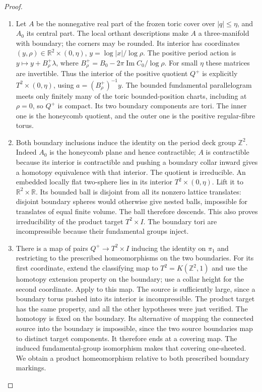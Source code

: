 \begin{proof}
\begin{enumerate}[label=\arabic*.,leftmargin=*]
\item Let $A$ be the nonnegative real part of the frozen toric
cover over $|q|\leq\eta$, and $A_0$ its central part.
The local orthant descriptions make $A$ a three-manifold
with boundary; the corners may be rounded.  Its interior
has coordinates $(y,\rho)\in\mathbb R^2\times(0,\eta)$,
$y=\log|x|/\log\rho$.  The positive period action is
$y\mapsto y+B_\rho^+\lambda$, where
$B_\rho^+=B_0-2\pi\operatorname{Im}C_0/\log\rho$.
For small $\eta$ these matrices are invertible.  Thus the
interior of the positive quotient $Q^+$ is explicitly
$T^2\times(0,\eta)$, using $a=(B_\rho^+)^{-1}y$.
The bounded fundamental parallelogram meets only finitely
many of the toric bounded-position charts, including at
$\rho=0$, so $Q^+$ is compact.  Its two boundary components
are tori.  The inner one is the honeycomb quotient, and
the outer one is the positive regular-fibre torus.

\item Both boundary inclusions induce the identity on the period
deck group $\mathbb Z^2$.  Indeed $A_0$ is the honeycomb
plane and hence contractible; $A$ is contractible because
its interior is contractible and pushing a boundary collar
inward gives a homotopy equivalence with that interior.
The quotient is irreducible.  An embedded locally flat
two-sphere lies in its interior $T^2\times(0,\eta)$.
Lift it to $\mathbb R^2\times\mathbb R$.  Its bounded
ball is disjoint from all its nonzero lattice translates:
disjoint boundary spheres would otherwise give nested
balls, impossible for translates of equal finite volume.
The ball therefore descends.  This also proves
irreducibility of the product target $T^2\times I$.
The boundary tori are incompressible because their
fundamental groups inject.

\item There is a map of pairs $Q^+\to T^2\times I$ inducing
the identity on $\pi_1$ and restricting to the prescribed
homeomorphisms on the two boundaries.  For its first
coordinate, extend the classifying map to $T^2=K(\mathbb
Z^2,1)$ and use the homotopy extension property on the
boundary; use a collar height for the second coordinate.
Apply \cite[Theorem 6.1, p.~77]{mapsWaldhausen68} to this
map.  The source is sufficiently large, since a boundary
torus pushed into its interior is incompressible.  The
product target has the same property, and all the other
hypotheses were just verified.  The homotopy is fixed on
the boundary.  Its alternative of mapping the connected
source into the boundary is impossible, since the two
source boundaries map to distinct target components.
It therefore ends at a covering map.  The induced
fundamental-group isomorphism makes that covering
one-sheeted.  We obtain a product homeomorphism relative
to both prescribed boundary markings.


\end{enumerate}
\end{proof}
